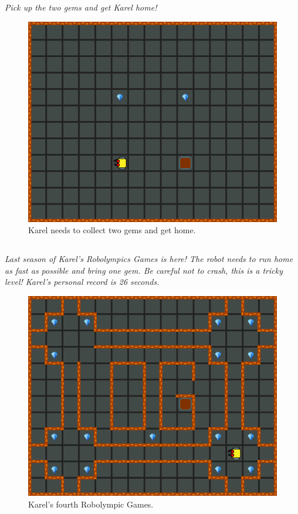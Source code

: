 \documentclass[article,A4,12pt]{llncs}
\begin{document}
\subsection{}

{\em Pick up the two gems and get Karel home!}

\begin{figure}[!ht]
\begin{center}
\includegraphics[height=0.4\textwidth]{imgk/a07.png}
\end{center}
\vspace{-4mm}
\caption{Karel needs to collect two gems and get home.}
\label{fig:a07}
\vspace{-1cm}
\end{figure}
\noindent

\subsection{}

{\em Last season of Karel's Robolympics Games is here! The 
robot needs to run home as fast as possible and bring one gem. 
Be careful not to crash, this is a tricky level! Karel's personal record is 26 seconds.}

\begin{figure}[!ht]
\begin{center}
\includegraphics[height=0.4\textwidth]{imgk/a08.png}
\end{center}
\vspace{-4mm}
\caption{Karel's fourth Robolympic Games.}
\label{fig:a08}
\vspace{-4mm}
\end{figure}
\noindent
\end{document}
